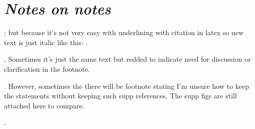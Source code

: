 \section{\textit{Notes on notes}}

\quad {}; but because it's not very easy with underlining with citation in latex so new text is just italic like this:
     .

\quad {}. Sometimes it's just the same text but redded to indicate need for discussion or clarification in the footnote.

\quad {}. However, sometimes the there will be footnote stating I'm unsure how to keep the statements without keeping such supp references. The supp figs are still attached here to compare.

\quad {}.
